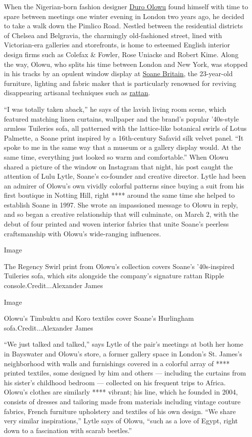 When the Nigerian-born fashion designer
\href{https://www.duroolowu.com/}{Duro Olowu} found himself with time to
spare between meetings one winter evening in London two years ago, he
decided to take a walk down the Pimlico Road. Nestled between the
residential districts of Chelsea and Belgravia, the charmingly
old-fashioned street, lined with Victorian-era galleries and
storefronts, is home to esteemed English interior design firms such as
Colefax \& Fowler, Rose Uniacke and Robert Kime. Along the way, Olowu,
who splits his time between London and New York, was stopped in his
tracks by an opulent window display at
\href{https://www.soane.co.uk/}{Soane Britain}, the 23-year-old
furniture, lighting and fabric maker that is particularly renowned for
reviving disappearing artisanal techniques such as
\href{https://www.nytimes3xbfgragh.onion/2017/08/15/t-magazine/design/wicker-furniture-larsson-korgmakare-soane-bonacina.html}{rattan}.

``I was totally taken aback,'' he says of the lavish living room scene,
which featured matching linen curtains, wallpaper and the brand's
popular '40s-style armless Tuileries sofa, all patterned with the
lattice-like botanical swirls of Lotus Palmette, a Soane print inspired
by a 16th-century Safavid silk velvet panel. ``It spoke to me in the
same way that a museum or a gallery display would. At the same time,
everything just looked so warm and comfortable.'' When Olowu shared a
picture of the window on Instagram that night, his post caught the
attention of Lulu Lytle, Soane's co-founder and creative director. Lytle
had been an admirer of Olowu's own vividly colorful patterns since
buying a suit from his first boutique in Notting Hill, right **** around
the same time she helped to establish Soane in 1997. She wrote an
impassioned message to Olowu in reply, and so began a creative
relationship that will culminate, on March 2, with the debut of four
printed and woven interior fabrics that unite Soane's peerless
craftsmanship with Olowu's wide-ranging influences.

Image

The Regency Swirl print from Olowu's collection covers Soane's
'40s-inspired Tuileries sofa, which sits alongside the company's
signature rattan Ripple console.Credit...Alexander James

Image

Olowu's Timbuktu and Koro textiles cover Soane's Hurlingham
sofa.Credit...Alexander James

``We just talked and talked,'' says Lytle of the pair's meetings at both
her home in Bayswater and Olowu's store, a former gallery space in
London's St. James's neighborhood with walls and furnishings covered in
a colorful array of **** printed textiles, some designed by him and
others --- including the curtains from his sister's childhood bedroom
--- collected on his frequent trips to Africa. Olowu's clothes are
similarly **** vibrant; his line, which he founded in 2004, consists of
dresses and tailoring made from materials including vintage couture
fabrics, French furniture upholstery and textiles of his own design.
``We share very similar inspirations,'' Lytle says of Olowu, ``such as a
love of Egypt, right down to a fascination with scarab beetles.''


